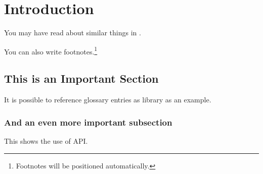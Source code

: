 \chapter{Introduction}\label{ch:intro}

You may have read about similar things in \cite[S.~X]{Goodliffe2007}.
\par
You can also write footnotes.\footnote{Footnotes will be positioned automatically.}
\blindtext

\blindtext[4]

\section{This is an Important Section}

It is possible to reference glossary entries as \gls{library} as an example.
\blindtext

\subsection{And an even more important subsection}

This shows the use of \ac{API}.
\blindtext
